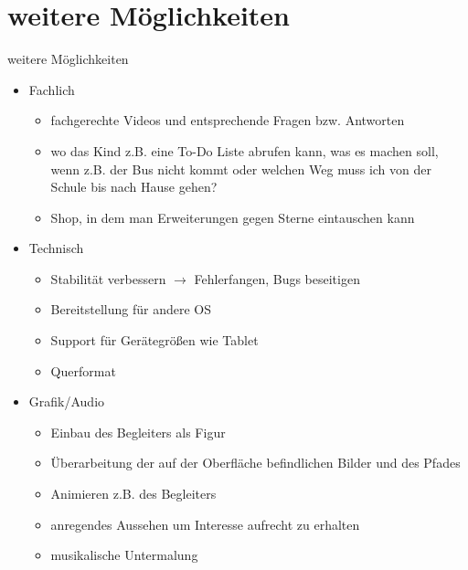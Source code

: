 \documentclass[10pt,fleqn]{beamer}
\begin{document}
\section{weitere Möglichkeiten}
\begin{frame}[t]{weitere Möglichkeiten}
	\begin{itemize}
		\item Fachlich
		\begin{itemize}
			\item fachgerechte Videos und entsprechende Fragen bzw. Antworten
			\item wo das Kind z.B. eine To-Do Liste abrufen kann, was es machen soll,
			wenn z.B. der Bus nicht kommt oder welchen Weg muss ich von der Schule bis nach
			Hause gehen?
			\item Shop, in dem man Erweiterungen gegen Sterne eintauschen kann
		\end{itemize}
		\item Technisch
		\begin{itemize}
			\item Stabilität verbessern $\rightarrow$ Fehlerfangen, Bugs beseitigen
			\item Bereitstellung für andere OS
			\item Support für Gerätegrößen wie Tablet
			\item Querformat
		\end{itemize}
		\item Grafik/Audio
		\begin{itemize}
			\item Einbau des Begleiters als Figur
			\item Überarbeitung der auf der Oberfläche befindlichen Bilder und des Pfades
			\item Animieren z.B. des Begleiters
			\item anregendes Aussehen um Interesse aufrecht zu erhalten
			\item musikalische Untermalung
		\end{itemize}
	\end{itemize}
\end{frame}
\end{document}
